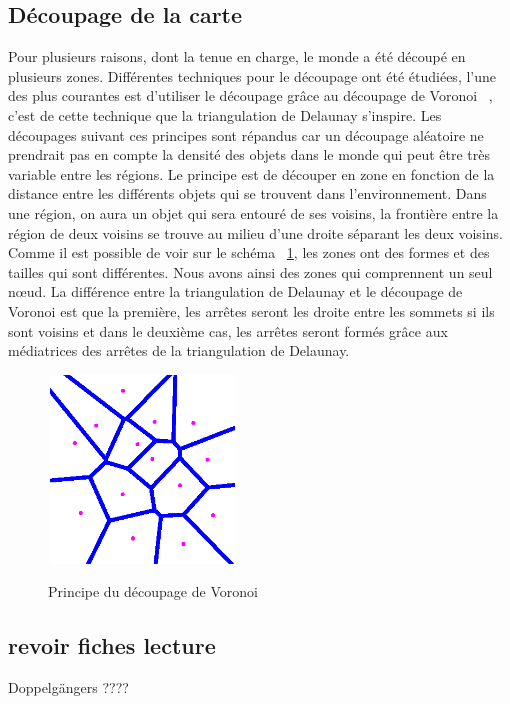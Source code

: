 	\subsection{Découpage de la carte}
	Pour plusieurs raisons, dont la tenue en charge, le monde a été découpé en plusieurs zones. Différentes techniques pour le découpage ont été étudiées, l'une des plus courantes est d'utiliser le découpage grâce au découpage de Voronoi ~\cite{1016552}, c'est de cette technique que la triangulation de Delaunay s'inspire. Les découpages suivant ces principes sont répandus car un découpage aléatoire ne prendrait pas en compte la densité des objets dans le monde qui peut être très variable entre les régions. Le principe est de découper en zone en fonction de la distance entre les différents objets qui se trouvent dans l'environnement. Dans une région, on aura un objet qui sera entouré de ses voisins, la frontière entre la région de deux voisins se trouve au milieu d'une droite séparant les deux voisins. Comme il est possible de voir sur le schéma ~\ref{Voronoi}, les zones ont des formes et des tailles qui sont différentes. Nous avons ainsi des zones qui comprennent un seul nœud. La différence entre la triangulation de Delaunay et le découpage de Voronoi est que la première, les arrêtes seront les droite entre les sommets si ils sont voisins et dans le deuxième cas, les arrêtes seront formés grâce aux médiatrices des arrêtes de la triangulation de Delaunay.\\ 
	\vspace{1cm}
        \begin{figure}[!h]
        \centering
        \includegraphics[width=5cm,height=5cm]{../Images/voronoi.png}\\
        \caption{Principe du découpage de Voronoi}
        \label{Voronoi}
        \end{figure}
        \vspace{1cm}


	\subsection{revoir fiches lecture} 

	Doppelgängers ????
